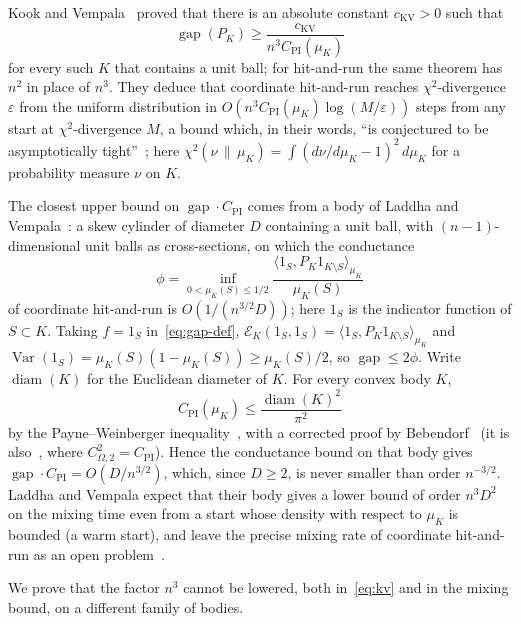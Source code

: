 \documentclass[11pt]{amsart}
\theoremstyle{remark}
\numberwithin{equation}{section}
\newcommand{\Var}{\operatorname{Var}}
\newcommand{\gap}{\operatorname{gap}}
\newcommand{\diam}{\operatorname{diam}}
\newcommand{\CPI}{C_{\mathrm{PI}}}
\begin{document}
Kook and Vempala~\cite[Theorem 1.1]{KV} proved that there is an absolute
constant $c_{\mathrm{KV}}>0$ such that
\begin{equation}\label{eq:kv}
 \gap(P_K)\ge \frac{c_{\mathrm{KV}}}{n^3\CPI(\mu_K)}
\end{equation}
for every such $K$ that contains a unit ball; for hit-and-run the same
theorem has $n^2$ in place of $n^3$. They deduce that coordinate hit-and-run
reaches $\chi^2$-divergence $\varepsilon$ from the uniform distribution in
$O(n^3\CPI(\mu_K)\log(M/\varepsilon))$ steps from any start at
$\chi^2$-divergence $M$, a bound which, in their words, ``is conjectured to
be asymptotically tight''~\cite[Section~1]{KV}; here
$\chi^2(\nu\,\|\,\mu_K)=\int(d\nu/d\mu_K-1)^2\,d\mu_K$ for a probability
measure $\nu$ on $K$.

The closest upper bound on $\gap\cdot\CPI$ comes from a body of Laddha and
Vempala~\cite[Theorem~5]{LV20}: a skew cylinder of diameter $D$ containing
a unit ball, with $(n-1)$-dimensional unit balls as cross-sections, on
which the conductance
\[
 \phi=\inf_{0<\mu_K(S)\le1/2}
 \frac{\langle 1_S,P_K1_{K\setminus S}\rangle_{\mu_K}}{\mu_K(S)}
\]
of coordinate hit-and-run is $O(1/(n^{3/2}D))$; here $1_S$ is the
indicator function of $S\subset K$. Taking $f=1_S$
in~\eqref{eq:gap-def}, $\mathcal E_K(1_S,1_S)=\langle
1_S,P_K1_{K\setminus S}\rangle_{\mu_K}$ and
$\Var(1_S)=\mu_K(S)(1-\mu_K(S))\ge\mu_K(S)/2$, so $\gap\le2\phi$. Write
$\diam(K)$ for the Euclidean diameter of $K$. For every convex body $K$,
\begin{equation}\label{eq:pw}
 \CPI(\mu_K)\le\frac{\diam(K)^2}{\pi^2}
\end{equation}
by the Payne--Weinberger inequality~\cite{PW}, with a corrected proof by Bebendorf~\cite{Beb}
(it is also~\cite[equation (1.4) and Theorem~1.1 at $p=2$]{ENT}, where $C_{\Omega,2}^2=\CPI$). Hence the conductance bound on that body gives
$\gap\cdot\CPI=O(D/n^{3/2})$, which, since $D\ge2$, is never smaller than order $n^{-3/2}$. Laddha and
Vempala expect that their body gives a lower bound of order $n^3D^2$ on
the mixing time even from a start whose density with respect to $\mu_K$ is bounded (a warm start), and leave the precise mixing rate
of coordinate hit-and-run as an open problem~\cite[Section~4]{LV20}.

We prove that the factor $n^3$ cannot be lowered, both in~\eqref{eq:kv}
and in the mixing bound, on a different family of bodies.
\end{document}
